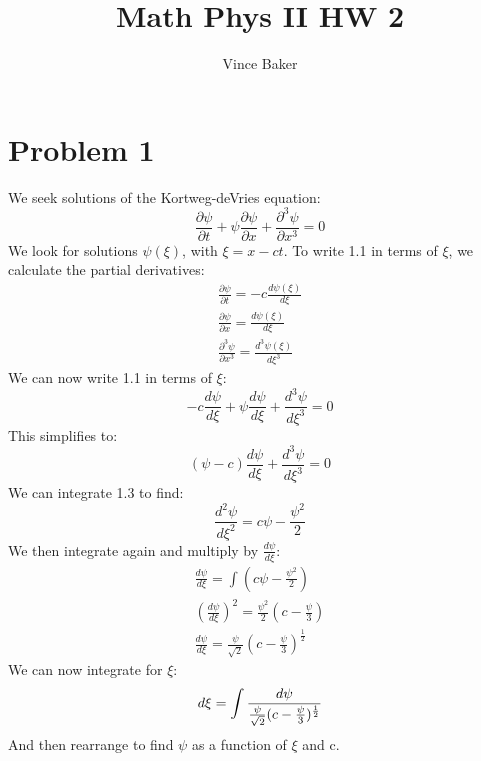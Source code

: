 \documentclass[a4paper,10pt]{article}
\title{Math Phys II HW 2}
\author{Vince Baker}
\numberwithin{equation}{section}
\begin{document}
\maketitle

\begin{abstract}

\end{abstract}

\section{Problem 1}
We seek solutions of the Kortweg-deVries equation:
\begin{equation}
 \frac{\partial \psi}{\partial t}+\psi\frac{\partial \psi}{\partial x}+\frac{\partial ^3 \psi}{\partial x^3}=0
\end{equation}
We look for solutions $\psi(\xi)$, with $\xi=x-ct$. To write 1.1 in terms of $\xi$, we calculate the partial derivatives:
\begin{gather*}
 \frac{\partial \psi}{\partial t}=-c\frac{d \psi(\xi)}{d \xi}\\
 \frac{\partial \psi}{\partial x}=\frac{d \psi(\xi)}{d \xi}\\
 \frac{\partial^3 \psi}{\partial x^3}=\frac{d^3 \psi(\xi)}{d \xi ^3}
\end{gather*}
We can now write 1.1 in terms of $\xi$:
\begin{equation} 
-c\frac{d \psi}{d \xi}+\psi\frac{d \psi}{d \xi}+\frac{d^3 \psi}{d \xi ^3}=0
\end{equation}
This simplifies to:
\begin{equation}
 (\psi-c)\frac{d \psi}{d \xi}+\frac{d^3 \psi}{d \xi ^3}=0
\end{equation}
We can integrate 1.3 to find:
\begin{equation}
 \frac{d^2\psi}{d\xi^2}=c\psi-\frac{\psi^2}{2}
\end{equation}
We then integrate again and multiply by $\frac{d \psi}{d \xi}$:
\begin{gather}
\frac{d\psi}{d\xi}=\int(c\psi-\frac{\psi^2}{2})\\
(\frac{d\psi}{d\xi})^2=\frac{\psi^2}{2}(c-\frac{\psi}{3})\\
\frac{d\psi}{d\xi}=\frac{\psi}{\sqrt{2}}(c-\frac{\psi}{3})^\frac{1}{2}
\end{gather}
We can now integrate for $\xi$:
\begin{equation}
 d\xi =\int \frac{d \psi}{\frac{\psi}{\sqrt{2}}(c-\frac{\psi}{3})^{\frac{1}{2}}}\\
\end{equation}
And then rearrange to find $\psi$ as a function of $\xi$ and c.
\end{document}
